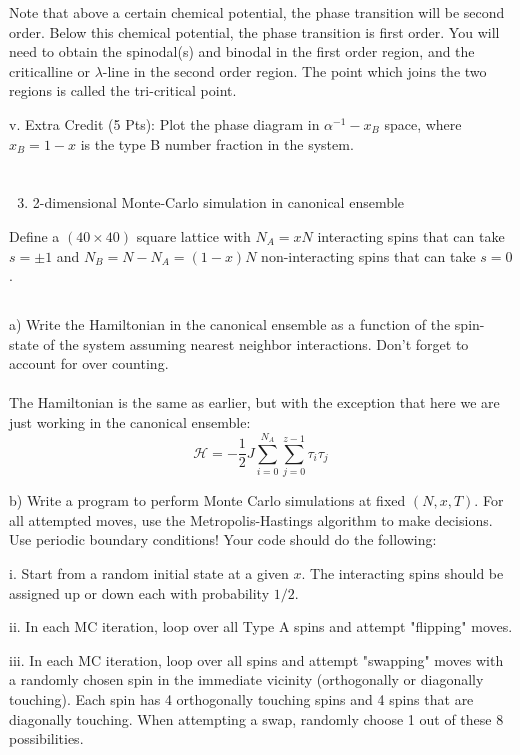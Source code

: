 \documentclass[12pt]{article}
\begin{document}
Note that above a certain chemical potential, the phase transition will be second order. Below this chemical potential, the phase transition is first order. You will need to obtain the spinodal(s) and binodal in the first order region, and the criticalline or $\lambda$-line in the second order region. The point which joins the two regions is called the tri-critical point.

v. Extra Credit (5 Pts): Plot the phase diagram in $\alpha^{-1}-x_{B}$ space, where $x_{B}=1-x$ is the type B number fraction in the system.
\section{}
\begin{enumerate}
  \setcounter{enumi}{2}
  \item 2-dimensional Monte-Carlo simulation in canonical ensemble
\end{enumerate}

Define a $(40 \times 40)$ square lattice with $N_{A}=x N$ interacting spins that can take $s= \pm 1$ and $N_{B}=N-N_{A}=(1-x) N$ non-interacting spins that can take $s=0$.
\subsection{}
a) Write the Hamiltonian in the canonical ensemble as a function of the spin-state of the system assuming nearest neighbor interactions. Don't forget to account for over counting.\\\\
The Hamiltonian is the same as earlier, but with the exception that here we are just working in the canonical ensemble:
\begin{equation}
  \mathcal{H}=-\frac{1}{2}J \sum_{i=0}^{N_{A}} \sum_{j=0}^{z-1} \tau_{i} \tau_{j}
\end{equation}


b) Write a program to perform Monte Carlo simulations at fixed $(N, x, T)$. For all attempted moves, use the Metropolis-Hastings algorithm to make decisions. Use periodic boundary conditions! Your code should do the following:

i. Start from a random initial state at a given $x$. The interacting spins should be assigned up or down each with probability $1 / 2$.

ii. In each MC iteration, loop over all Type A spins and attempt "flipping" moves.

iii. In each MC iteration, loop over all spins and attempt "swapping" moves with a randomly chosen spin in the immediate vicinity (orthogonally or diagonally touching). Each spin has 4 orthogonally touching spins and 4 spins that are diagonally touching. When attempting a swap, randomly choose 1 out of these 8 possibilities.
\end{document}
